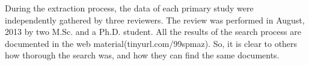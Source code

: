 During the extraction process, the data of each primary study were independently gathered by three reviewers. The review was performed in August, 2013 by two M.Sc. and a Ph.D. student. All the results of the search process are documented in the web material(tinyurl.com/99spmaz). So, it is clear to others how thorough the search was, and how they can find the same documents.
